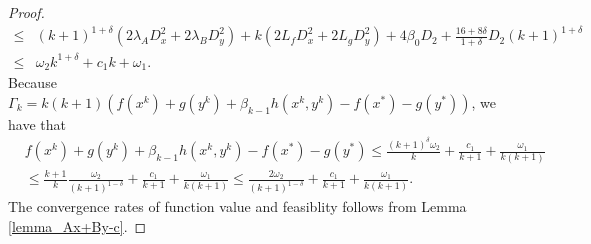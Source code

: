 \documentclass{article}
\numberwithin{equation}{section}
\begin{document}
\begin{proof}
\begin{align}
        \leq& (k+1)^{1+\delta}(2\lambda_{A} D_x^2+ 2\lambda_{B} D_y^2)+ k(2L_fD_x^2+2L_gD_y^2 ) 
        +4\beta_0D_2 + \frac{16+8\delta}{1+\delta}D_2(k+1)^{1+\delta} \nonumber \\ 
        \leq& \omega_2k^{1+\delta} + c_1k + \omega_1.     
    \end{align} 
    Because $\Gamma_k = k(k+1)\left(f(x^k)+ g(y^k)+ \beta_{k-1}h(x^k,y^k) -f(x^*)-g(y^*)\right)$, we have that
    \begin{align}
        &f(x^k) +g(y^k)+\beta_{k-1}h(x^k,y^k) -f(x^*)-g(y^*) \leq \frac{(k+1)^{\delta}\omega_2}{k} + \frac{c_1}{k+1}+\frac{\omega_1}{k(k+1)}  \nonumber\\
        & \leq \frac{k+1}{k}\frac{\omega_2}{(k+1)^{1-\delta}} +\frac{c_1}{k+1} +\frac{\omega_1}{k(k+1)} 
        \leq \frac{2\omega_2}{(k+1)^{1-\delta}} +\frac{c_1}{k+1} +\frac{\omega_1}{k(k+1)}. \label{Fk-F*_leq}
    \end{align}
    The convergence rates of function value and feasiblity follows from Lemma \ref{lemma_Ax+By-c}. 
\end{proof}
\end{document}
